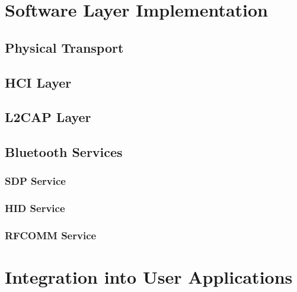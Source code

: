 
\section{Software Layer Implementation}


\FloatBarrier
\subsection{Physical Transport}


\FloatBarrier
\subsection{HCI Layer}


\FloatBarrier
\subsection{L2CAP Layer}


\FloatBarrier
\subsection{Bluetooth Services}


\FloatBarrier
\subsubsection{SDP Service}


\FloatBarrier
\subsubsection{HID Service}


\FloatBarrier
\subsubsection{RFCOMM Service}


\section{Integration into User Applications}

